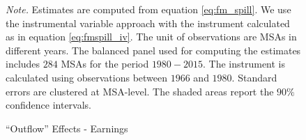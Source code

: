 \documentclass[dv_diss_main.tex]{subfiles}
\begin{document}
\begin{figure}[ht]
\begin{center}
\begin{tabular}[c]{ccc}
    \end{tabular}
    \caption{``Outflow'' Effects - Earnings}
    \end{center}
    
    
    
    \footnotesize{\textit{Note. } Estimates are computed from  equation \eqref{eq:fm_spill}. We use the instrumental variable approach with the instrument calculated as in equation \eqref{eq:fmspill_iv}. The unit of observations are MSAs in different years. The balanced panel used for computing the estimates includes $284$ MSAs for the period $1980-2015$. The instrument is calculated using observations between $1966$ and $1980$. Standard errors are clustered at MSA-level. The shaded areas report the $90\%$ confidence intervals.}
    \label{fig:earn_spill}
\end{figure}
\newpage
\end{document}
